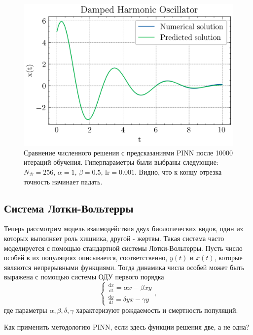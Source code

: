 \documentclass[a4paper, 12pt]{article}
\begin{document}
\begin{figure}
    \centering
    \includegraphics{../images/oscillator/Damped Harmonic Oscillator.png}
    \caption{Сравнение численного решения с предсказаниями PINN после 10000 итераций обучения. Гиперпараметры были выбраны следующие: $N_\mathcal{D} = 256$, $\alpha = 1$, $\beta = 0.5$, $\mathrm{lr} = 0.001$. Видно, что к концу отрезка точность начинает падать.}
    \label{fig:oscillator:solution}
\end{figure}

\subsection{Система Лотки-Вольтерры}

Теперь рассмотрим модель взаимодействия двух биологических видов, один из которых выполняет роль хищника, другой - жертвы. Такая система часто моделируется с помощью стандартной системы Лотки-Вольтерры. Пусть число особей в их популяциях описывается, соответственно, $y(t)$ и $x(t)$, которые являются непрерывными функциями. Тогда динамика числа особей может быть выражена с помощью системы ОДУ первого порядка
\begin{equation} \label{eq:lotkavolterra:diffeq}
\begin{cases}
    \frac{\mathrm{d}x}{\mathrm{d}t} = \alpha x - \beta x y \\
    \frac{\mathrm{d}y}{\mathrm{d}t} = \delta y x - \gamma y
\end{cases},
\end{equation}
где параметры $\alpha, \beta, \delta, \gamma$ характеризуют рождаемость и смертность популяций.

Как применить методологию PINN, если здесь функции решения две, а не одна?
\end{document}
